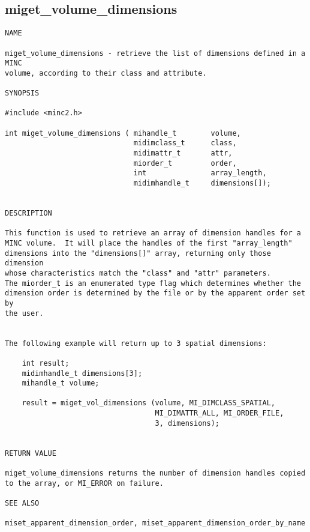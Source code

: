 \documentclass{article}
\begin{document}
\subsection{miget\_volume\_dimensions}
\begin{verbatim}
NAME  

miget_volume_dimensions - retrieve the list of dimensions defined in a MINC 
volume, according to their class and attribute.

SYNOPSIS

#include <minc2.h>

int miget_volume_dimensions ( mihandle_t        volume, 
                              midimclass_t      class, 
                              midimattr_t       attr, 
                              miorder_t         order,
                              int               array_length,
                              midimhandle_t     dimensions[]);
                              

DESCRIPTION

This function is used to retrieve an array of dimension handles for a
MINC volume.  It will place the handles of the first "array_length"
dimensions into the "dimensions[]" array, returning only those dimension
whose characteristics match the "class" and "attr" parameters. 
The miorder_t is an enumerated type flag which determines whether the
dimension order is determined by the file or by the apparent order set by 
the user.


The following example will return up to 3 spatial dimensions:

    int result;
    midimhandle_t dimensions[3];
    mihandle_t volume;

    result = miget_vol_dimensions (volume, MI_DIMCLASS_SPATIAL, 
                                   MI_DIMATTR_ALL, MI_ORDER_FILE, 
                                   3, dimensions);


RETURN VALUE

miget_volume_dimensions returns the number of dimension handles copied 
to the array, or MI_ERROR on failure.

SEE ALSO

miset_apparent_dimension_order, miset_apparent_dimension_order_by_name
\end{verbatim}
\end{document}

